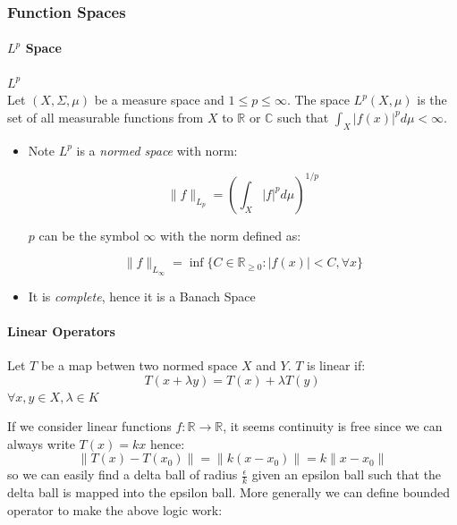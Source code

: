 \subsubsection{Function Spaces}

%
\providecommand{\argmin}{\operatorname*{arg\,min}}%
\providecommand{\argmax}{\operatorname*{arg\,max}}%
\paragraph{$L^p$ Space}

\begin{definition}[ space]\textbf{$L^p$}\\
Let $(X,\Sigma, \mu)$ be a measure space and $1\leq p\leq \infty$. The space $L^p(X,\mu)$ is the set of all measurable functions from $X$ to $\mathbb{R}$ or $\mathbb{C}$ such that $\int_X |f(x)|^p d\mu < \infty$.

\begin{itemize}
\item Note $L^p$ is a \textit{normed space} with norm:

\begin{equation}
\|f\|_{L_p}=\left(\int_X |f|^p d\mu\right)^{1/p}
\end{equation}


$p$ can be the symbol $\infty$ with the norm defined as:

\begin{equation}
\|f\|_{L_{\infty}} = \inf\{C\in \mathbb{R}_{\geq 0} : |f(x)|<C, \forall x\}
\end{equation}


\item It is \textit{complete}, hence it is a Banach Space
\end{itemize}

\end{definition}\paragraph{Linear Operators}

\begin{definition}Let $T$ be a map betwen two normed space $X$ and $Y$. $T$ is linear if:
\begin{equation}
T(x+\lambda y) = T(x) +\lambda T(y)
\end{equation}
$\forall x,y \in X, \lambda \in K$

\end{definition}If we consider linear functions $f:\mathbb{R}\to \mathbb{R}$, it seems continuity is free since we can always write $T(x)=kx$ hence:
\begin{equation}
\|T(x)-T(x_0)\|=\|k(x-x_0)\|=k\|x-x_0\|
\end{equation}
so we can easily find a delta ball of radius $\frac{\epsilon}{k}$ given an epsilon ball such that the delta ball is mapped into the epsilon ball. More generally we can define bounded operator to make the above logic work:

